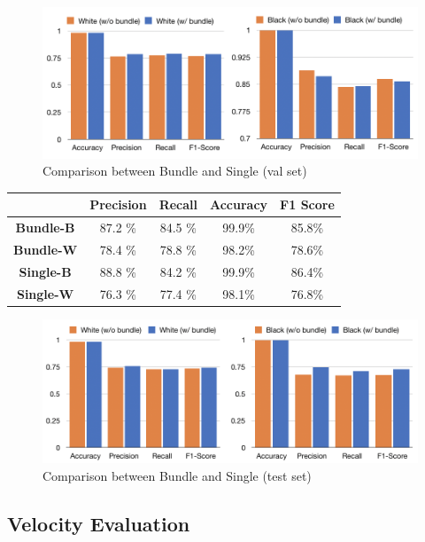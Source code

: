\documentclass[10pt,twocolumn,letterpaper]{article}
\begin{document}
\begin{figure}[h!]
   \centering
   \includegraphics[width=\linewidth]{fig/18.png}
   \caption{Comparison between Bundle and Single (val set)}
\end{figure}

\begin{minipage}{0.9\linewidth}
   \centering
\begin{tabular}{ccccc}
   \toprule
   & Precision &Recall&Accuracy& F1 Score\\
   \midrule
   \textbf{Bundle-B} &87.2 \%& 84.5 \%&99.9\%& 85.8\%\\
   \textbf{Bundle-W} &78.4 \%& 78.8 \%&98.2\%& 78.6\%\\
   \textbf{Single-B} &88.8 \%& 84.2 \%&99.9\%& 86.4\%\\
   \textbf{Single-W} &76.3 \%& 77.4 \%&98.1\%& 76.8\%\\
   \bottomrule
   \end{tabular}
    \label{tab:prevdataset}

\end{minipage}
\begin{figure}[h!]
   \centering
   \includegraphics[width=\linewidth]{fig/17.png}
   \caption{Comparison between Bundle and Single (test set)}
\end{figure}


\subsection{Velocity Evaluation}
\end{document}
